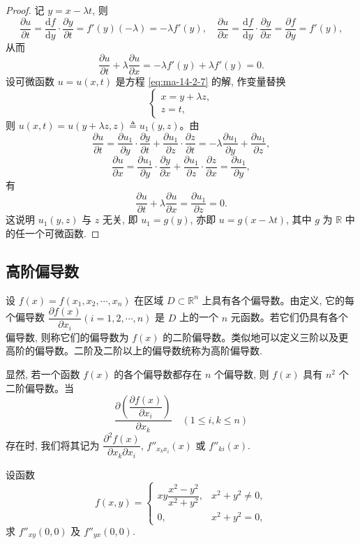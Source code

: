 \begin{proof}
记 $y=x-\lambda t$, 则
\[
  \frac{\partial u}{\partial t}
  =\frac{\mathrm df}{\mathrm dy}\cdot\frac{\partial y}{\partial t}
  =f'(y)(-\lambda)=-\lambda f'(y),
  \quad
  \frac{\partial u}{\partial x}
  =\frac{\mathrm df}{\mathrm dy}\cdot\frac{\partial y}{\partial x}
  =\frac{\partial f}{\partial y}=f'(y),
\]
从而
\[
  \frac{\partial u}{\partial t}+\lambda\frac{\partial u}{\partial x}
  =-\lambda f'(y)+\lambda f'(y)=0.
\]
设可微函数 $u=u(x,t)$ 是方程 \eqref{eq:ma-14-2-7} 的解, 作变量替换
\[
  \begin{cases}
    x=y+\lambda z,\\
    z=t,
  \end{cases}
\]
则 $u(x,t)=u(y+\lambda z,z)\triangleq u_1(y,z)$。由
\[
  \frac{\partial u}{\partial t}
  =\frac{\partial u_1}{\partial y}\cdot\frac{\partial y}{\partial t}
  +\frac{\partial u_1}{\partial z}\cdot\frac{\partial z}{\partial t}
  =-\lambda\frac{\partial u_1}{\partial y}
  +\frac{\partial u_1}{\partial z},
\]
\[
  \frac{\partial u}{\partial x}
  =\frac{\partial u_1}{\partial y}\cdot\frac{\partial y}{\partial x}
  +\frac{\partial u_1}{\partial z}\cdot\frac{\partial z}{\partial x}
  =\frac{\partial u_1}{\partial y},
\]
有
\[
  \frac{\partial u}{\partial t}+\lambda\frac{\partial u}{\partial x}
  =\frac{\partial u_1}{\partial z}=0.
\]
这说明 $u_1(y,z)$ 与 $z$ 无关, 即 $u_1=g(y)$, 亦即 $u=g(x-\lambda t)$, 其中 $g$ 为 $\mathbb R$ 中的任一个可微函数.
\end{proof}


\subsection{高阶偏导数}
\label{subsec:ma-14-2-3}

设 $f(x)=f(x_1,x_2,\cdots,x_n)$ 在区域 $D\subset\mathbb R^n$ 上具有各个偏导数。由定义, 它的每个偏导数 $\dfrac{\partial f(x)}{\partial x_i}(i=1,2,\cdots,n)$ 是 $D$ 上的一个 $n$ 元函数。若它们仍具有各个偏导数, 则称它们的偏导数为 $f(x)$ 的二阶偏导数。类似地可以定义三阶以及更高阶的偏导数。二阶及二阶以上的偏导数统称为高阶偏导数.

显然, 若一个函数 $f(x)$ 的各个偏导数都存在 $n$ 个偏导数, 则 $f(x)$ 具有 $n^2$ 个二阶偏导数。当
\[
  \frac{\partial\left(\dfrac{\partial f(x)}{\partial x_i}\right)}{\partial x_k}
  \quad(1\leqslant i,k\leqslant n)
\]
存在时, 我们将其记为 $\dfrac{\partial^2 f(x)}{\partial x_k\partial x_i}$, $f''_{x_kx_i}(x)$ 或 $f''_{ki}(x)$.

\begin{example}\label{example:ma-14-2-7}
设函数
\[
  f(x,y)=
  \begin{cases}
    xy\dfrac{x^2-y^2}{x^2+y^2}, &x^2+y^2\ne0,\\
    0, &x^2+y^2=0,
  \end{cases}
\]
求 $f''_{xy}(0,0)$ 及 $f''_{yx}(0,0)$.
\end{example}


